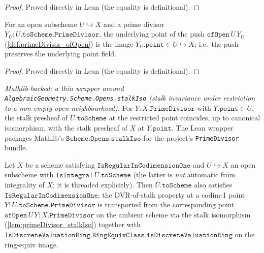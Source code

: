 \begin{proof}
  Proved directly in Lean (the equality is definitional).
\end{proof}
\begin{lemma}

  \label{lem:primeDivisor_ofOpen_point}
  For an open subscheme \(U \hookrightarrow X\) and a prime divisor
  \(Y_U : U.\texttt{toScheme}.\texttt{PrimeDivisor}\), the underlying point of
  the push \(\texttt{ofOpen}\,U\,Y_U\) (\ref{def:primeDivisor_ofOpen}) is the
  image \(Y_U.\texttt{point} \in U \hookrightarrow X\); i.e.\ the push
  preserves the underlying point field.
\end{lemma}
\begin{proof}
  Proved directly in Lean (the equality is definitional).
\end{proof}
\begin{lemma}

  \label{lem:primeDivisor_stalkIso}
  \textit{Mathlib-backed: a thin wrapper around
  \texttt{AlgebraicGeometry.Scheme.Opens.stalkIso} (stalk invariance under
  restriction to a non-empty open neighbourhood).}
  For \(Y : X.\texttt{PrimeDivisor}\) with \(Y.\texttt{point} \in U\), the
  stalk presheaf of \(U.\texttt{toScheme}\) at the restricted point coincides,
  up to canonical isomorphism, with the stalk presheaf of \(X\) at
  \(Y.\texttt{point}\). The Lean wrapper packages Mathlib's
  \(\texttt{Scheme.Opens.stalkIso}\) for the project's
  \texttt{PrimeDivisor} bundle.
\end{lemma}
\begin{theorem}

  \label{thm:isRegularInCodimensionOne_open}
  Let \(X\) be a scheme satisfying \(\texttt{IsRegularInCodimensionOne}\)
  and \(U \hookrightarrow X\) an open subscheme with
  \(\texttt{IsIntegral}\,U.\texttt{toScheme}\) (the latter is \emph{not}
  automatic from integrality of \(X\); it is threaded explicitly).
  Then \(U.\texttt{toScheme}\) also satisfies
  \(\texttt{IsRegularInCodimensionOne}\); the DVR-of-stalk property at a
  codim-1 point \(Y : U.\texttt{toScheme}.\texttt{PrimeDivisor}\) is
  transported from the corresponding point
  \(\texttt{ofOpen}\,U\,Y : X.\texttt{PrimeDivisor}\) on the ambient
  scheme via the stalk isomorphism (\ref{lem:primeDivisor_stalkIso})
  together with
  \(\texttt{IsDiscreteValuationRing.RingEquivClass.isDiscreteValuationRing}\)
  on the ring-equiv image.
\end{theorem}

